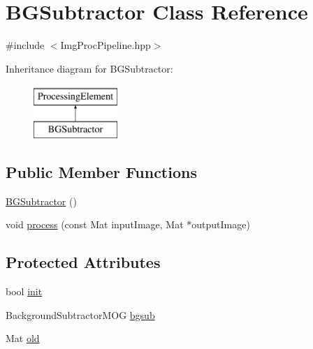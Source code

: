 \hypertarget{classBGSubtractor}{\section{\-B\-G\-Subtractor \-Class \-Reference}
\label{classBGSubtractor}
}


{\ttfamily \#include $<$\-Img\-Proc\-Pipeline.\-hpp$>$}

\-Inheritance diagram for \-B\-G\-Subtractor\-:\begin{figure}[H]
\begin{center}
\leavevmode
\includegraphics[height=2.000000cm]{classBGSubtractor}
\end{center}
\end{figure}
\subsection*{\-Public \-Member \-Functions}
\begin{DoxyCompactItemize}
\item 
\hyperlink{classBGSubtractor_abdad6162a4cf458b0a91f221b02e0674}{\-B\-G\-Subtractor} ()
\item 
void \hyperlink{classBGSubtractor_ae318282fabc50c12ac0ebea29d2d2396}{process} (const \-Mat input\-Image, \-Mat $\ast$output\-Image)
\end{DoxyCompactItemize}
\subsection*{\-Protected \-Attributes}
\begin{DoxyCompactItemize}
\item 
bool \hyperlink{classBGSubtractor_a36f50b8934eb526d9c93e46169c28a2c}{init}
\item 
\-Background\-Subtractor\-M\-O\-G \hyperlink{classBGSubtractor_a9bf82e388f0d6b691ff4db17ac9e61f3}{bgsub}
\item 
\-Mat \hyperlink{classBGSubtractor_a667a712976bde1a2116f310d804f3c4e}{old}
\end{DoxyCompactItemize}


